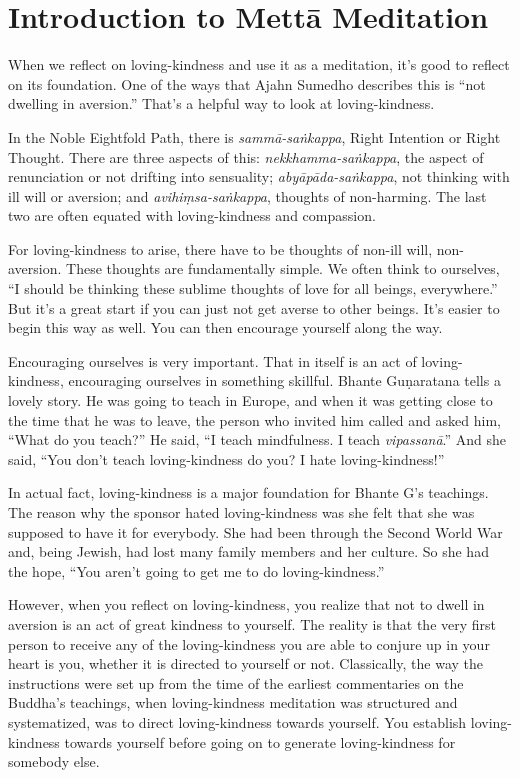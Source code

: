 \chapter{Introduction to Mettā
Meditation}

When we reflect on loving-kindness and use it as a meditation, it’s good
to reflect on its foundation. One of the ways that Ajahn Sumedho
describes this is “not dwelling in aversion.” That’s a helpful way to
look at loving-kindness.

In the Noble Eightfold Path, there is \emph{sammā-saṅkappa}, Right
Intention or Right Thought. There are three aspects of this:
\emph{nekkhamma-saṅkappa}, the aspect of renunciation or not drifting
into sensuality; \emph{abyāpāda-saṅkappa}, not thinking with ill will or
aversion; and \emph{avihiṃsa-saṅkappa}, thoughts of non-harming. The
last two are often equated with loving-kindness and compassion.

For loving-kindness to arise, there have to be thoughts of non-ill will,
non-aversion. These thoughts are fundamentally simple. We often think to
ourselves, “I should be thinking these sublime thoughts of love for all
beings, everywhere.” But it’s a great start if you can just not get
averse to other beings. It’s easier to begin this way as well. You can
then encourage yourself along the way.

Encouraging ourselves is very important. That in itself is an act of
loving-kindness, encouraging ourselves in something skillful. Bhante
Guṇaratana tells a lovely story. He was going to teach in Europe, and
when it was getting close to the time that he was to leave, the person
who invited him called and asked him, “What do you teach?” He said, “I
teach mindfulness. I teach \emph{vipassanā}.” And she said, “You don’t
teach loving-kindness do you? I hate loving-kindness!”

In actual fact, loving-kindness is a major foundation for Bhante G’s
teachings. The reason why the sponsor hated loving-kindness was she felt
that she was supposed to have it for everybody. She had been through the
Second World War and, being Jewish, had lost many family members and her
culture. So she had the hope, “You aren’t going to get me to do
loving-kindness.”

However, when you reflect on loving-kindness, you realize that not to
dwell in aversion is an act of great kindness to yourself. The reality
is that the very first person to receive any of the loving-kindness you
are able to conjure up in your heart is you, whether it is directed to
yourself or not. Classically, the way the instructions were set up from
the time of the earliest commentaries on the Buddha’s teachings, when
loving-kindness meditation was structured and systematized, was to
direct loving-kindness towards yourself. You establish loving-kindness
towards yourself before going on to generate loving-kindness for
somebody else.


